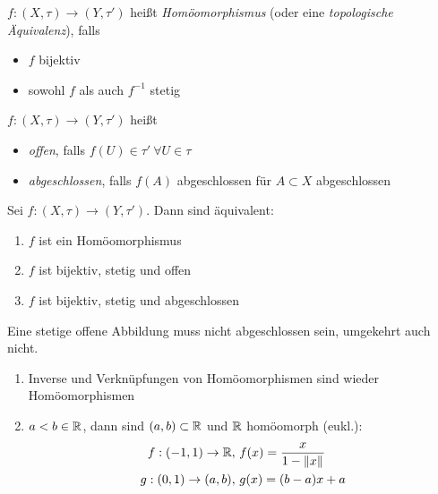 \documentclass{skript}
\begin{document}
\begin{dfn}
    $f:(X,\tau)\to(Y,\tau')$ heißt \emph{Homöomorphismus} (oder eine
    \emph{topologische Äquivalenz}), falls
    \begin{itemize}
        \item $f$ bijektiv
        \item sowohl $f$ als auch $f^{-1}$ stetig
    \end{itemize}
\end{dfn}

\begin{dfn}
    $f:(X,\tau)\to(Y,\tau')$ heißt
    \begin{itemize}
        \item \emph{offen}, falls $f(U)\in \tau'\ \forall U\in\tau$
        \item \emph{abgeschlossen}, falls $f(A)$ abgeschlossen für $A\subset X$
            abgeschlossen
    \end{itemize}
\end{dfn}

\begin{lem}
    Sei $f:(X,\tau)\to(Y,\tau')$. Dann sind äquivalent:
    \begin{enumerate}
        \item $f$ ist ein Homöomorphismus
        \item $f$ ist bijektiv, stetig und offen
        \item $f$ ist bijektiv, stetig und abgeschlossen
    \end{enumerate}
    \begin{bem}
        Eine stetige offene Abbildung muss nicht abgeschlossen sein, umgekehrt auch
        nicht.
    \end{bem}
    \begin{bsps}
        \begin{enumerate}
            \item Inverse und Verknüpfungen von Homöomorphismen sind wieder
                Homöomorphismen
            \item $a < b\in\mathbb{R}$, dann sind $(a,b)\subset\mathbb{R}$ und $\mathbb{R}$ homöomorph
                (eukl.):
                \begin{align}
                    f:(-1,1)\to\R,\ &f(x) = \frac{x}{1-\norm{x}} \\
                    g:(0,1)\to(a,b),\ &g(x) = (b-a)x + a
                \end{align}
        \end{enumerate}
    \end{bsps}
\end{lem}
\end{document}

